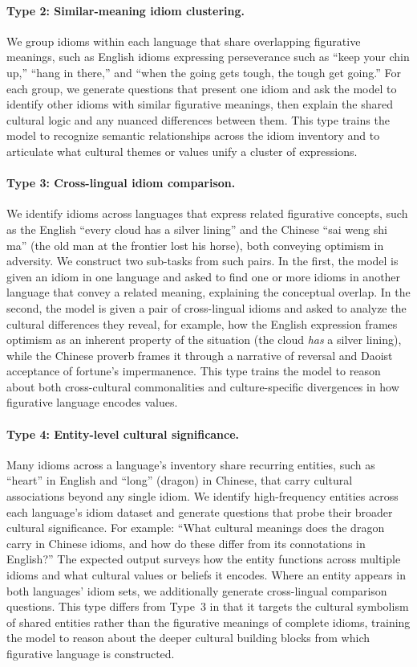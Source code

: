 \documentclass[11pt,a4paper]{article}
\begin{document}
\paragraph{Type 2: Similar-meaning idiom clustering.} We group idioms within each language that share overlapping figurative meanings, such as English idioms expressing perseverance such as ``keep your chin up,'' ``hang in there,'' and ``when the going gets tough, the tough get going.'' For each group, we generate questions that present one idiom and ask the model to identify other idioms with similar figurative meanings, then explain the shared cultural logic and any nuanced differences between them. This type trains the model to recognize semantic relationships across the idiom inventory and to articulate what cultural themes or values unify a cluster of expressions.

\paragraph{Type 3: Cross-lingual idiom comparison.} We identify idioms across languages that express related figurative concepts, such as the English ``every cloud has a silver lining'' and the Chinese ``sai weng shi ma'' (the old man at the frontier lost his horse), both conveying optimism in adversity. We construct two sub-tasks from such pairs. In the first, the model is given an idiom in one language and asked to find one or more idioms in another language that convey a related meaning, explaining the conceptual overlap. In the second, the model is given a pair of cross-lingual idioms and asked to analyze the cultural differences they reveal, for example, how the English expression frames optimism as an inherent property of the situation (the cloud \textit{has} a silver lining), while the Chinese proverb frames it through a narrative of reversal and Daoist acceptance of fortune's impermanence. This type trains the model to reason about both cross-cultural commonalities and culture-specific divergences in how figurative language encodes values.

\paragraph{Type 4: Entity-level cultural significance.} Many idioms across a language's inventory share recurring entities, such as ``heart'' in English and ``long'' (dragon) in Chinese, that carry cultural associations beyond any single idiom. We identify high-frequency entities across each language's idiom dataset and generate questions that probe their broader cultural significance. For example: ``What cultural meanings does the dragon carry in Chinese idioms, and how do these differ from its connotations in English?'' The expected output surveys how the entity functions across multiple idioms and what cultural values or beliefs it encodes. Where an entity appears in both languages' idiom sets, we additionally generate cross-lingual comparison questions. This type differs from Type~3 in that it targets the cultural symbolism of shared entities rather than the figurative meanings of complete idioms, training the model to reason about the deeper cultural building blocks from which figurative language is constructed.
\end{document}
